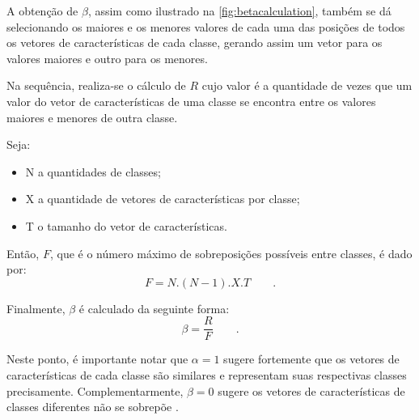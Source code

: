 			\par A obtenção de $\beta$, assim como ilustrado na  \autoref{fig:betacalculation}, também se dá selecionando os maiores e os menores valores de cada uma das posições de todos os vetores de características de cada classe, gerando assim um vetor para os valores maiores e outro para os menores.
			
			\par Na sequência, realiza-se o cálculo de $R$ cujo valor é a quantidade de vezes que um valor do vetor de características de uma classe se encontra entre os valores maiores e menores de outra classe.
			
			\par Seja:
			\begin{itemize}
				\item N a quantidades de classes;
				\item X a quantidade de vetores de características por classe;
				\item T o tamanho do vetor de características.
			\end{itemize}
			
			\par Então, $F$, que é o número máximo de sobreposições possíveis entre classes, é dado por:
			\begin{equation}
				F=N.(N-1).X.T \qquad.
			\end{equation}
			\par Finalmente, $\beta$ é calculado da seguinte forma:
			\begin{equation}
				\beta=\dfrac{R}{F} \qquad.
			\end{equation}
	
			\par Neste ponto, é importante notar que $\alpha=1$ sugere fortemente que os vetores de características de cada classe são similares e representam suas respectivas classes precisamente. Complementarmente, $\beta=0$ sugere os vetores de características de classes diferentes não se sobrepõe \cite{8588433}.
			
